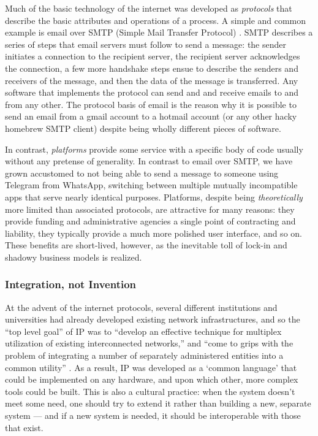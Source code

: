 \documentclass[10pt]{article}
\begin{document}
\begin{multicols}{2}
Much of the basic technology of the internet was developed as
\emph{protocols} that describe the basic attributes and operations of a
process. A simple and common example is email over SMTP (Simple Mail
Transfer Protocol)\cite{Rfc5321SimpleMail} . SMTP describes a
series of steps that email servers must follow to send a message: the
sender initiates a connection to the recipient server, the recipient
server acknowledges the connection, a few more handshake steps ensue to
describe the senders and receivers of the message, and then the data of
the message is transferred. Any software that implements the protocol
can send and and receive emails to and from any other. The protocol
basis of email is the reason why it is possible to send an email from a
gmail account to a hotmail account (or any other hacky homebrew SMTP
client) despite being wholly different pieces of software.

In contrast, \emph{platforms} provide some service with a specific body
of code usually without any pretense of generality. In contrast to email
over SMTP, we have grown accustomed to not being able to send a message
to someone using Telegram from WhatsApp, switching between multiple
mutually incompatible apps that serve nearly identical purposes.
Platforms, despite being \emph{theoretically} more limited than
associated protocols, are attractive for many reasons: they provide
funding and administrative agencies a single point of contracting and
liability, they typically provide a much more polished user interface,
and so on. These benefits are short-lived, however, as the inevitable
toll of lock-in and shadowy business models is realized.

\hypertarget{integration-not-invention}{%
\subsubsection{Integration, not
Invention}\label{integration-not-invention}}

At the advent of the internet protocols, several different institutions
and universities had already developed existing network infrastructures,
and so the ``top level goal'' of IP was to ``develop an effective
technique for multiplex utilization of existing interconnected
networks,'' and ``come to grips with the problem of integrating a number
of separately administered entities into a common utility'' \cite{clarkDesignPhilosophyDARPA1988} . As a result, IP was developed as a
`common language' that could be implemented on any hardware, and upon
which other, more complex tools could be built. This is also a cultural
practice: when the system doesn't meet some need, one should try to
extend it rather than building a new, separate system --- and if a new
system is needed, it should be interoperable with those that exist.


\end{multicols}
\end{document}
